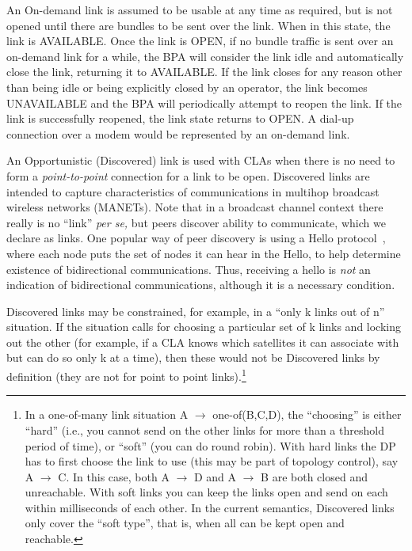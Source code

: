 \documentclass[11pt]{article}
\begin{document}
An On-demand link is assumed to be usable at any time as required, but is not
opened until there are bundles to be sent over the link. When in this state,
the link is AVAILABLE. Once the link is OPEN, if no bundle traffic is sent over
an on-demand link for a while, the BPA will consider the link idle and
automatically close the link, returning it to AVAILABLE. If the link closes for
any reason other than being idle or being explicitly closed by an operator, the
link becomes UNAVAILABLE and the BPA will periodically attempt to reopen the
link. If the link is successfully reopened, the link state returns to OPEN. A
dial-up connection over a modem would be represented by an
on-demand link.

An Opportunistic (Discovered) link is used with CLAs when there is no need 
to form a {\em point-to-point} connection for a link to be open.   
Discovered links are intended to capture characteristics of communications in 
multihop broadcast wireless networks (MANETs). Note that
in a broadcast channel context there really is no ``link'' {\it per se,} but peers
discover ability to communicate, which we declare as links. 
One
popular way of peer discovery is using a Hello protocol~\cite{OLSR}, where each
node puts the set of nodes it can hear in the Hello, to help determine
existence of bidirectional communications. Thus, receiving a hello is {\em not}
an indication of bidirectional communications, although it is a necessary
condition.

Discovered links may be constrained, for example, in a ``only k links out 
of n'' situation.  
If the situation calls for choosing a particular set of k links and
locking out the other (for example, if a CLA knows which satellites it
can associate with but can do so only k at a time), then these would
not be Discovered links by definition (they are not for point to point
links).\footnote{In a one-of-many link situation A $\rightarrow$
one-of(B,C,D), the ``choosing'' is either ``hard'' (i.e., you cannot
send on the other links for more than a threshold period of time), or
``soft'' (you can do round robin).  With hard links the DP has to
first choose the link to use (this may be part of topology control),
say A $\rightarrow$ C. In this case, both A $\rightarrow$ D and A
$\rightarrow$ B are both closed and unreachable. With soft links you
can keep the links open and send on each within milliseconds of each
other.  In the current semantics, Discovered links only cover the
``soft type'', that is, when all can be kept open and reachable.}
\end{document}
